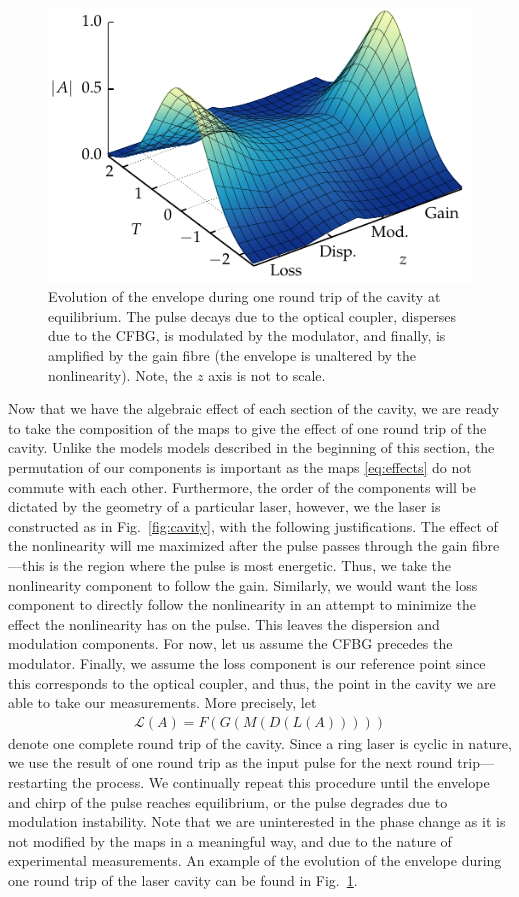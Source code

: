 \documentclass[9pt,twocolumn,twoside]{osajnl}
\begin{document}
\begin{figure}[tbp]
	\centering
	\includegraphics{Figures/Evo}
	\caption{Evolution of the envelope during one round trip of the cavity at equilibrium. The pulse decays due to the optical coupler, disperses due to the CFBG, is modulated by the modulator, and finally, is amplified by the gain fibre (the envelope is unaltered by the nonlinearity). Note, the $z$ axis is not to scale.}
	\label{fig:cavityevo}
\end{figure}

Now that we have the algebraic effect of each section of the cavity, we are ready to take the composition of the maps to give the effect of one round trip of the cavity. Unlike the models models described in the beginning of this section, the permutation of our components is important as the maps \eqref{eq:effects} do not commute with each other. Furthermore, the order of the components will be dictated by the geometry of a particular laser, however, we the laser is constructed as in Fig.~\ref{fig:cavity},  with the following justifications. The effect of the nonlinearity will me maximized after the pulse passes through the gain fibre---this is the region where the pulse is most energetic. Thus, we take the nonlinearity component to follow the gain. Similarly, we would want the loss component to directly follow the nonlinearity in an attempt to minimize the effect the nonlinearity has on the pulse. This leaves the dispersion and modulation components. For now, let us assume the CFBG precedes the modulator. Finally, we assume the loss component is our reference point since this corresponds to the optical coupler, and thus, the point in the cavity we are able to take our measurements. More precisely, let
\begin{align}
	\mathcal{L}(A) = F(G(M(D(L(A)))))
	\label{eq:order}
\end{align}
denote one complete round trip of the cavity. Since a ring laser is cyclic in nature, we use the result of one round trip as the input pulse for the next round trip---restarting the process. We continually repeat this procedure until the envelope and chirp of the pulse reaches equilibrium, or the pulse degrades due to modulation instability. Note that we are uninterested in the phase change as it is not modified by the maps in a meaningful way, and due to the nature of experimental measurements. An example of the evolution of the envelope during one round trip of the laser cavity can be found in Fig.~\ref{fig:cavityevo}.
\end{document}
